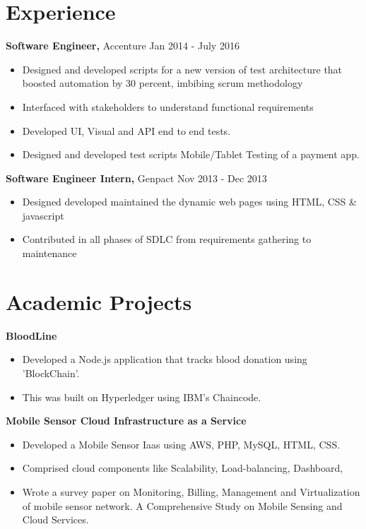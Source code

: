\documentclass[margin]{res}
\begin{document}
\begin{resume}
\section{Experience}

 {\bf Software Engineer,} Accenture \hfill Jan  2014  - July 2016
 \begin{itemize} \itemsep -1pt  %
 \item Designed and developed scripts for a new version of test architecture that boosted automation by 30 percent, imbibing scrum methodology
 \item Interfaced with stakeholders to understand functional requirements
  \item Developed UI, Visual and API end to end tests.
  \item Designed and developed test scripts Mobile/Tablet Testing of a payment app.
 \end{itemize}
 
 {\bf Software Engineer Intern,} Genpact \hfill Nov  2013  - Dec 2013
 \begin{itemize} \itemsep -1pt  %
 \item Designed developed maintained the dynamic web pages using HTML, CSS & javascript
 \item Contributed in all phases of SDLC from requirements gathering to maintenance
\end{itemize}
 
\section{Academic Projects}
 
 {\bf BloodLine }
 \begin{itemize} \itemsep -2pt  %
 \item Developed a Node.js application that tracks blood donation using 'BlockChain'.
 \item This was built on Hyperledger using IBM's Chaincode.
 \end{itemize}
 
 {\bf Mobile Sensor Cloud Infrastructure as a Service }
 \begin{itemize} \itemsep -2pt  %
 \item Developed a Mobile Sensor Iaas  using  AWS, PHP, MySQL, HTML, CSS.
 \item Comprised cloud components like Scalability, Load-balancing, Dashboard, \item Wrote a survey paper on Monitoring, Billing, Management and Virtualization of mobile sensor network.
 A Comprehensive Study on Mobile Sensing and Cloud Services.
 \end{itemize}
 

\end{resume}
\end{document}
